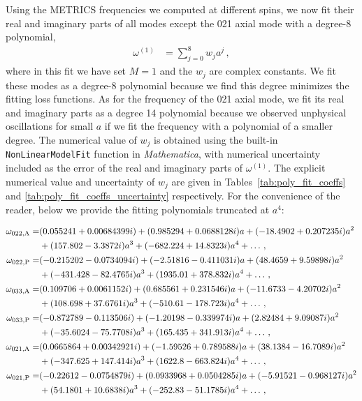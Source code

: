 \documentclass[aps,prx,amsmath,floats,floatfix,twocolumn,
  superscriptaddress,nofootinbib,showpacs]{revtex4-1}
\begin{document}
Using the METRICS frequencies we computed at different spins, we now fit their real and imaginary parts of all modes except the 021 axial mode with a degree-8 polynomial, 
\begin{equation}\label{eq:omega_1_fitted}
\begin{split}
\omega^{(1)} & = \sum_{j=0}^{8} w_{j} a^j\,,
\end{split}
\end{equation}
where in this fit we have set $M=1$ and the $w_j$ are complex constants. 
We fit these modes as a degree-8 polynomial because we find this degree minimizes the fitting loss functions. 
As for the frequency of the 021 axial mode, we fit its real and imaginary parts as a degree 14 polynomial because we observed unphysical oscillations for small $a$ if we fit the frequency with a polynomial of a smaller degree. 
The numerical value of $w_j$ is obtained using the built-in \texttt{NonLinearModelFit} function in \textit{Mathematica}, with numerical uncertainty included as the error of the real and imaginary parts of $\omega^{(1)}$. 
The explicit numerical value and uncertainty of $w_j$ are given in Tables~\ref{tab:poly_fit_coeffs} and \ref{tab:poly_fit_coeffs_uncertainty} respectively. 
For the convenience of the reader, below we provide the fitting polynomials truncated at $a^4$: 
\begin{widetext}
\begin{align}
\omega_{022,\rm A} = & (0.055241 + 0.00684399i) + (0.985294+0.0688128i) a 
+ (- 18.4902 + 0.207235i) a^2 
\nonumber \\
&+ (157.802- 3.3872i) a^3 
+ (- 682.224 + 14.8323i) a^4 + \ldots\,, \\
%
\omega_{022,\rm P} = & (-0.215202 -0.0734094i) 
+(- 2.51816 - 0.411031i)a 
+ (48.4659 + 9.59898i)a^2 
\nonumber \\
& +(- 431.428 - 82.4765i)a^3 
+(1935.01 + 378.832i)a^4 + \ldots\,, \\
\label{eq:METRICS_fitting_polynomials}
\omega_{033,\rm A} = & (0.109706 + 0.0061152i) 
+ (0.685561+0.231546i) a 
+ (- 11.6733 - 4.20702i) a^2 
\nonumber \\
& + (108.698 + 37.6761i) a^3 
+ (-510.61- 178.723i) a^4 + \ldots\,, 
\\
\omega_{033,\rm P} = & (-0.872789 -0.113506i) 
+ (- 1.20198- 0.339974i) a 
+ (2.82484 + 9.09087i) a^2 
\nonumber \\
& + (- 35.6024 - 75.7708i) a^3
+ (165.435 + 341.913i) a^4 + \ldots\,, \\
\omega_{021,\rm A} = & (0.0665864 + 0.00342921i) 
+ (- 1.59526+0.789588i) a 
+ (38.1384 - 16.7089i) a^2 
\nonumber \\
& + (- 347.625 + 147.414i) a^3 
+ (1622.8 - 663.824i) a^4 + \ldots\,, \\
\omega_{021,\rm P} = & (-0.22612 -0.0754879i) 
+ (0.0933968 + 0.0504285i)a 
+(-5.91521 - 0.968127i)a^2 
\nonumber \\
& +(54.1801 + 10.6838i)a^3 
+(-252.83 - 51.1785i)a^4 + \ldots\,,
\end{align}
\end{widetext}
\end{document}
